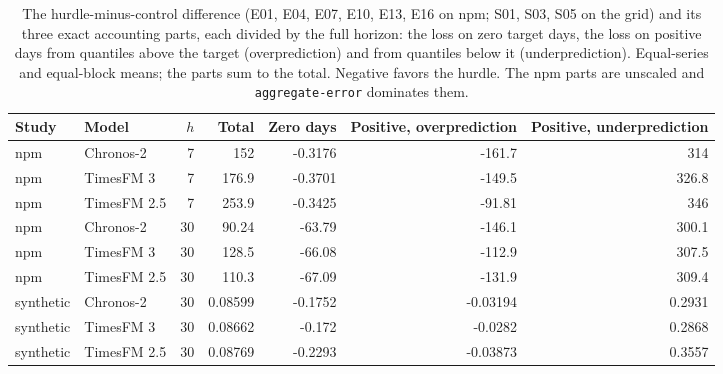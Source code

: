 \begin{table}[htbp]
\centering\small
\caption{The hurdle-minus-control difference (E01, E04, E07, E10, E13, E16 on npm; S01, S03, S05 on the
grid) and its three exact accounting parts, each divided by the full horizon: the loss on zero target days,
the loss on positive days from quantiles above the target (overprediction) and from quantiles below it
(underprediction). Equal-series and equal-block means; the parts sum to the total. Negative favors the
hurdle. The npm parts are unscaled and \texttt{aggregate-error} dominates them.}
\label{tab:s2parts}
\begin{tabular}{llrrrrr}
\toprule
Study & Model & $h$ & Total & Zero days & Positive, overprediction & Positive, underprediction \\
\midrule
npm & Chronos-2 & 7 & 152 & -0.3176 & -161.7 & 314 \\
npm & TimesFM 3 & 7 & 176.9 & -0.3701 & -149.5 & 326.8 \\
npm & TimesFM 2.5 & 7 & 253.9 & -0.3425 & -91.81 & 346 \\
npm & Chronos-2 & 30 & 90.24 & -63.79 & -146.1 & 300.1 \\
npm & TimesFM 3 & 30 & 128.5 & -66.08 & -112.9 & 307.5 \\
npm & TimesFM 2.5 & 30 & 110.3 & -67.09 & -131.9 & 309.4 \\
synthetic & Chronos-2 & 30 & 0.08599 & -0.1752 & -0.03194 & 0.2931 \\
synthetic & TimesFM 3 & 30 & 0.08662 & -0.172 & -0.0282 & 0.2868 \\
synthetic & TimesFM 2.5 & 30 & 0.08769 & -0.2293 & -0.03873 & 0.3557 \\
\bottomrule
\end{tabular}
\end{table}

